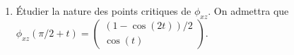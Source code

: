 \documentclass[a4paper]{tp_um}
\begin{document}
\begin{enumerate}
\begin{enumerate}
\begin{center}
{\begin{tabular}{|c|ccccccccc|}
                            \begin{minipage}{3.3em}{\small signe de $x'(t)$}\end{minipage} &&&&&&&&&	\\[0.4cm]\hline
                            \begin{minipage}{3.3em}{\small variation de $x(t)$}\end{minipage} &&&&&&&&&	\\[0.4cm]\hline
                            \begin{minipage}{3.3em}{\small signe de $z'(t)$}\end{minipage} &&&&&&&&&	\\[0.4cm]\hline
                            \begin{minipage}{3.3em}{\small variation de $z(t)$}\end{minipage} &&&&&&&&&	\\[0.4cm]\hline
                        \end{tabular}
                    }
                \end{center}
            \item Étudier la nature des points critiques de $\phi_{xz}$. On admettra que $\phi_{xz}(\pi/2 +t) =  \begin{pmatrix} (1 - \cos(2t))/2 \\ \cos(t) \end{pmatrix}$.



\end{enumerate}
\end{enumerate}
\end{document}
